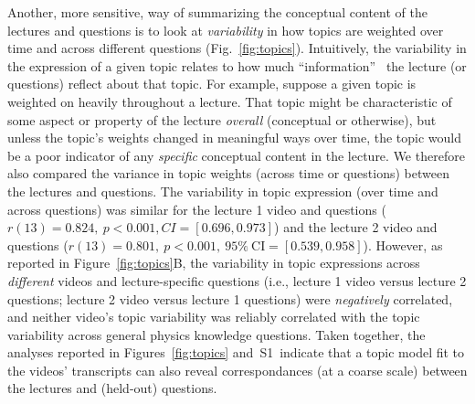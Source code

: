 \documentclass[10pt]{article}
\newcommand{\topicWeights}{S1}
\begin{document}
Another, more sensitive, way of summarizing the conceptual content of the
lectures and questions is to look at \textit{variability} in how topics are
weighted over time and across different questions (Fig.~\ref{fig:topics}).
Intuitively, the variability in the expression of a given topic relates to how
much ``information''~\citep{Fish22} the lecture (or questions) reflect about
that topic. For example, suppose a given topic is weighted on heavily
throughout a lecture. That topic might be characteristic of some aspect or
property of the lecture \textit{overall} (conceptual or otherwise), but unless
the topic's weights changed in meaningful ways over time, the topic would be a
poor indicator of any \textit{specific} conceptual content in the lecture. We
therefore also compared the variance in topic weights (across time or
questions) between the lectures and questions. The variability in topic
expression (over time and across questions) was similar for the lecture 1 video
and questions ($r(13) = 0.824,~p<0.001, CI = [0.696, 0.973]$) and the lecture 2
video and questions ($r(13) = 0.801,~p<0.001,~95\%~\mathrm{CI} = [0.539,
0.958]$). However, as reported in Figure~\ref{fig:topics}B, the variability in
topic expressions across \textit{different} videos and lecture-specific
questions (i.e., lecture 1 video versus lecture 2 questions; lecture 2 video
versus lecture 1 questions) were \textit{negatively} correlated, and neither
video's topic variability was reliably correlated with the topic variability
across general physics knowledge questions. Taken together, the analyses
reported in Figures~\ref{fig:topics} and~\topicWeights~indicate that a topic
model fit to the videos' transcripts can also reveal correspondances (at a
coarse scale) between the lectures and (held-out) questions.
\end{document}
